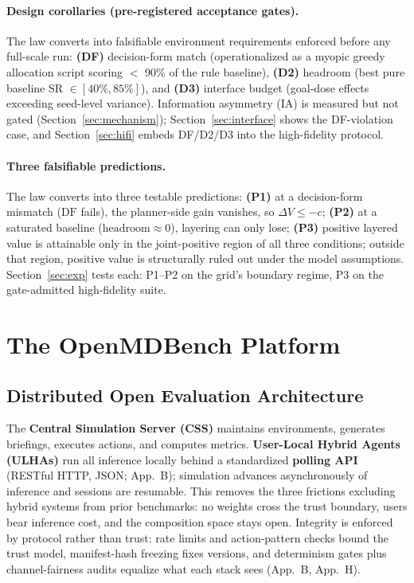 \documentclass[sigconf,anonymous]{aamas}
\newcommand{\sapp}[1]{App.~#1}
\newcommand{\headroom}{\mathrm{headroom}}
\begin{document}
\paragraph{Design corollaries (pre-registered acceptance gates).}
The law converts into falsifiable environment requirements enforced before any full-scale run: \textbf{(DF)} decision-form match (operationalized as a myopic greedy allocation script scoring $<$ 90\% of the rule baseline), \textbf{(D2)} headroom (best pure baseline SR $\in [40\%, 85\%]$), and \textbf{(D3)} interface budget (goal-dose effects exceeding seed-level variance). Information asymmetry (IA) is measured but not gated (Section~\ref{sec:mechanism}); Section~\ref{sec:interface} shows the DF-violation case, and Section~\ref{sec:hifi} embeds DF/D2/D3 into the high-fidelity protocol.

\paragraph{Three falsifiable predictions.}
The law converts into three testable predictions: \textbf{(P1)} at a decision-form mismatch ($\mathrm{DF}$ fails), the planner-side gain vanishes, so $\Delta V \le -c$; \textbf{(P2)} at a saturated baseline ($\headroom \approx 0$), layering can only lose; \textbf{(P3)} positive layered value is attainable only in the joint-positive region of all three conditions; outside that region, positive value is structurally ruled out under the model assumptions. Section~\ref{sec:exp} tests each: P1--P2 on the grid's boundary regime, P3 on the gate-admitted high-fidelity suite.



\section{The OpenMDBench Platform}\label{sec:platform}

\subsection{Distributed Open Evaluation Architecture}\label{sec:arch}

The \textbf{Central Simulation Server (CSS)} maintains environments, generates briefings, executes actions, and computes metrics. \textbf{User-Local Hybrid Agents (ULHAs)} run all inference locally behind a standardized \textbf{polling API} (RESTful HTTP, JSON; \sapp{B}); simulation advances asynchronously of inference and sessions are resumable. This removes the three frictions excluding hybrid systems from prior benchmarks: no weights cross the trust boundary, users bear inference cost, and the composition space stays open. Integrity is enforced by protocol rather than trust: rate limits and action-pattern checks bound the trust model, manifest-hash freezing fixes versions, and determinism gates plus channel-fairness audits equalize what each stack sees (\sapp{B}, \sapp{H}).
\end{document}
